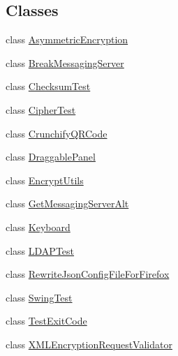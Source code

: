 \subsection*{Classes}
\begin{DoxyCompactItemize}
\item 
class \hyperlink{classgov_1_1fnal_1_1ppd_1_1dd_1_1testing_1_1AsymmetricEncryption}{Asymmetric\-Encryption}
\item 
class \hyperlink{classgov_1_1fnal_1_1ppd_1_1dd_1_1testing_1_1BreakMessagingServer}{Break\-Messaging\-Server}
\item 
class \hyperlink{classgov_1_1fnal_1_1ppd_1_1dd_1_1testing_1_1ChecksumTest}{Checksum\-Test}
\item 
class \hyperlink{classgov_1_1fnal_1_1ppd_1_1dd_1_1testing_1_1CipherTest}{Cipher\-Test}
\item 
class \hyperlink{classgov_1_1fnal_1_1ppd_1_1dd_1_1testing_1_1CrunchifyQRCode}{Crunchify\-Q\-R\-Code}
\item 
class \hyperlink{classgov_1_1fnal_1_1ppd_1_1dd_1_1testing_1_1DraggablePanel}{Draggable\-Panel}
\item 
class \hyperlink{classgov_1_1fnal_1_1ppd_1_1dd_1_1testing_1_1EncryptUtils}{Encrypt\-Utils}
\item 
class \hyperlink{classgov_1_1fnal_1_1ppd_1_1dd_1_1testing_1_1GetMessagingServerAlt}{Get\-Messaging\-Server\-Alt}
\item 
class \hyperlink{classgov_1_1fnal_1_1ppd_1_1dd_1_1testing_1_1Keyboard}{Keyboard}
\item 
class \hyperlink{classgov_1_1fnal_1_1ppd_1_1dd_1_1testing_1_1LDAPTest}{L\-D\-A\-P\-Test}
\item 
class \hyperlink{classgov_1_1fnal_1_1ppd_1_1dd_1_1testing_1_1RewriteJsonConfigFileForFirefox}{Rewrite\-Json\-Config\-File\-For\-Firefox}
\item 
class \hyperlink{classgov_1_1fnal_1_1ppd_1_1dd_1_1testing_1_1SwingTest}{Swing\-Test}
\item 
class \hyperlink{classgov_1_1fnal_1_1ppd_1_1dd_1_1testing_1_1TestExitCode}{Test\-Exit\-Code}
\item 
class \hyperlink{classgov_1_1fnal_1_1ppd_1_1dd_1_1testing_1_1XMLEncryptionRequestValidator}{X\-M\-L\-Encryption\-Request\-Validator}
\end{DoxyCompactItemize}
